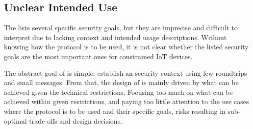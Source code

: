 \documentclass[runningheads, envcountsame, hidelinks, a4paper, draft, x11names]{llncs}
\begin{document}
%

\subsection{Unclear Intended Use}
\label{sec:unclearProtocolUse}
%
The \mEdhoc{} \mSpec{} lists several specific security goals, but they are
imprecise and difficult to interpret due to lacking context and intended usage
descriptions.
%
Without knowing how the protocol is to be used,
it is not clear whether the listed security goals are the most important ones
for constrained IoT devices.
%

The abstract goal of \mEdhoc{} is simple: establish an \mOscore{} security
context using few roundtrips and small messages.
%
From that, the design of \mEdhoc{} is mainly driven by what
can be achieved given the technical restrictions.
%
Focusing too much on what can be achieved within given restrictions, and paying
too little attention to the use cases where the
protocol is to be used and their specific goals, risks resulting in
sub-optimal trade-offs and design decisions.
%
\end{document}
